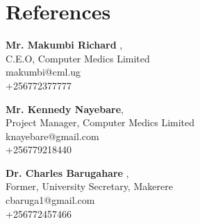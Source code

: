 \documentclass[]{plushcv}
\begin{document}

\section{References}\label{sec:references}
\begin{multicols}{3}
\color{BlueGreen}
\sectionsep
{\textbf{Mr. Makumbi Richard }}, \\ C.E.O, Computer Medics Limited \\
 \faEnvelope \quad makumbi@cml.ug \\ \faPhone \quad +256772377777
\sectionsep
\columnbreak

{\textbf{Mr. Kennedy Nayebare}, \\ Project Manager, Computer Medics Limited} \\
 \faEnvelope \quad knayebare@gmail.com \\ \faPhone \quad  +256779218440
\sectionsep
\columnbreak

{\textbf{Dr. Charles Barugahare }}, \\ Former, University Secretary, Makerere \\
 \faEnvelope \quad cbaruga1@gmail.com \\ \faPhone  \quad+256772457466 
\end{multicols}









\end{document}

